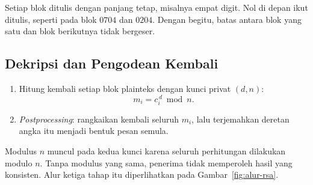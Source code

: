 Setiap blok ditulis dengan panjang tetap, misalnya empat digit. Nol di depan
ikut ditulis, seperti pada blok $0704$ dan $0204$. Dengan begitu, batas antara
blok yang satu dan blok berikutnya tidak bergeser.

\subsection{Dekripsi dan Pengodean Kembali}

\begin{enumerate}
    \item Hitung kembali setiap blok plainteks dengan kunci privat $(d, n)$:
          \begin{equation}
          m_i = c_i^{\,d} \bmod n.
          \label{eq:dekripsi-blok}
          \end{equation}
    \item \textit{Postprocessing}: rangkaikan kembali seluruh $m_i$, lalu
          terjemahkan deretan angka itu menjadi bentuk pesan semula.
\end{enumerate}

Modulus $n$ muncul pada kedua kunci karena seluruh perhitungan dilakukan
modulo $n$. Tanpa modulus yang sama, penerima tidak memperoleh hasil yang
konsisten. Alur ketiga tahap itu diperlihatkan pada Gambar~\ref{fig:alur-rsa}.


